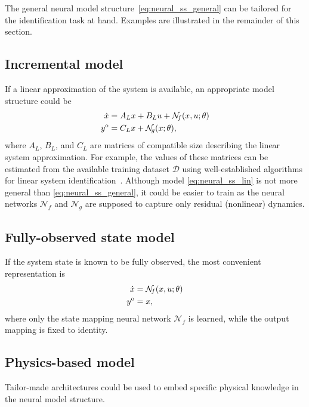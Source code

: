 \documentclass{article} %
\newcommand{\NN}{\mathcal{N}} %
\newcommand{\Did}{{\mathcal{D}}}
\newcommand{\ymodel}{y^{\rm o}}
\begin{document}
The general neural model structure~\eqref{eq:neural_ss_general} can be tailored for the identification task at hand. Examples are illustrated in the remainder of this section. 

\subsection{Incremental model}
If a linear approximation of the system is available, an appropriate model structure could be
\begin{subequations}
\label{eq:neural_ss_lin}
\begin{align}
 \dot x   &= A_L x + B_L u + \NN_{\!f}(x, u; \theta)  \label{eq:neural_ss_lin_state}\\
 \ymodel   &= C_L x + \NN_{\!g}(x; \theta),
\end{align}
\end{subequations}
where $A_L$, $B_L$, and $C_L$ are matrices of compatible size describing the linear system approximation. For example, the values of these matrices can be estimated from the available training dataset $\Did$ using well-established  algorithms for linear system identification~\cite{ljung:1999system,van1994n4sid}.  
  Although model \eqref{eq:neural_ss_lin} is not more general than \eqref{eq:neural_ss_general}, it could be easier to train  as the neural networks $\NN_{\!f}$ and $\NN_{\!g}$ are supposed to capture only residual (nonlinear) dynamics. 


\subsection{Fully-observed state model}
If the system state is known to be fully observed, the most  convenient representation is 
\begin{subequations}
\label{eq:neural_ss_full}
\begin{align}
 \dot x &= \NN_{\!f}(x, u; \theta) \label{eq:neural_ss_state} \\ 
 \ymodel     &= x,
\end{align}
\end{subequations}
where only the state mapping neural network $\NN_{\!f}$ is learned, while the output mapping is fixed to identity. 

 
\subsection{Physics-based model}
Tailor-made architectures could  be used to embed specific physical knowledge in the neural model structure.
\end{document}
